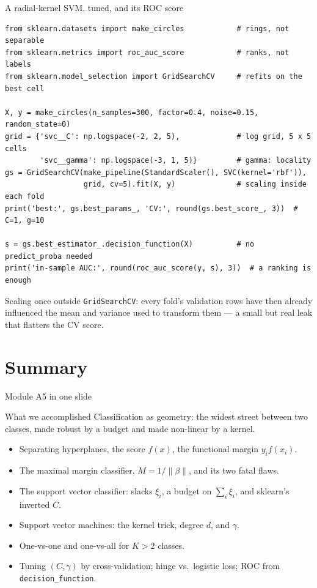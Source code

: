 \documentclass[aspectratio=169,11pt]{beamer}
\begin{document}
\begin{frame}[fragile]{A radial-kernel SVM, tuned, and its ROC score}
  \begin{lstlisting}[basicstyle=\ttfamily\scriptsize]
from sklearn.datasets import make_circles            # rings, not separable
from sklearn.metrics import roc_auc_score            # ranks, not labels
from sklearn.model_selection import GridSearchCV     # refits on the best cell

X, y = make_circles(n_samples=300, factor=0.4, noise=0.15, random_state=0)
grid = {'svc__C': np.logspace(-2, 2, 5),             # log grid, 5 x 5 cells
        'svc__gamma': np.logspace(-3, 1, 5)}         # gamma: locality
gs = GridSearchCV(make_pipeline(StandardScaler(), SVC(kernel='rbf')),
                  grid, cv=5).fit(X, y)              # scaling inside each fold
print('best:', gs.best_params_, 'CV:', round(gs.best_score_, 3))  # C=1, g=10

s = gs.best_estimator_.decision_function(X)          # no predict_proba needed
print('in-sample AUC:', round(roc_auc_score(y, s), 3))  # a ranking is enough
  \end{lstlisting}
  \begin{mistake}
    Scaling once outside \texttt{GridSearchCV}: every fold's validation rows
    have then already influenced the mean and variance used to transform them
    --- a small but real leak that flatters the CV score.
  \end{mistake}
\end{frame}

\section{Summary}

\begin{frame}{Module A5 in one slide}
  \footnotesize
  \begin{block}{What we accomplished}
    Classification as geometry: the widest street between two classes, made
    robust by a budget and made non-linear by a kernel.
  \end{block}
  \begin{itemize}
    \item Separating hyperplanes, the score $f(x)$, the functional margin
          $y_i f(x_i)$.
    \item The maximal margin classifier, $M=1/\|\beta\|$, and its two fatal
          flaws.
    \item The support vector classifier: slacks $\xi_i$, a budget on
          $\sum_i\xi_i$, and sklearn's inverted $C$.
    \item Support vector machines: the kernel trick, degree $d$, and $\gamma$.
    \item One-vs-one and one-vs-all for $K>2$ classes.
    \item Tuning $(C,\gamma)$ by cross-validation; hinge vs.\ logistic loss;
          ROC from \texttt{decision\_function}.
  \end{itemize}
\end{frame}
\end{document}
